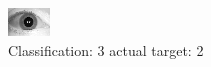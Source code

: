 \begin{figure}[h!]
\begin{center}
\includegraphics[width=0.60\columnwidth]{figures/ID1763_class_3_target_2.png}
\end{center}
\caption{ Classification: 3 actual target: 2}
\label{fig:ID1763_class_3_target_2}
\end{figure}
